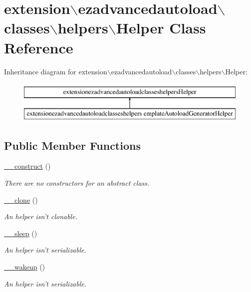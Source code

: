 \hypertarget{classextension_1_1ezadvancedautoload_1_1classes_1_1helpers_1_1_helper}{\section{extension$\backslash$ezadvancedautoload$\backslash$classes$\backslash$helpers$\backslash$\-Helper \-Class \-Reference}
\label{classextension_1_1ezadvancedautoload_1_1classes_1_1helpers_1_1_helper}
}
\-Inheritance diagram for extension$\backslash$ezadvancedautoload$\backslash$classes$\backslash$helpers$\backslash$\-Helper\-:\begin{figure}[H]
\begin{center}
\leavevmode
\includegraphics[height=2.000000cm]{classextension_1_1ezadvancedautoload_1_1classes_1_1helpers_1_1_helper}
\end{center}
\end{figure}
\subsection*{\-Public \-Member \-Functions}
\begin{DoxyCompactItemize}
\item 
\hyperlink{classextension_1_1ezadvancedautoload_1_1classes_1_1helpers_1_1_helper_add85e885141598709a72bfb9597faca7}{\-\_\-\-\_\-construct} ()
\begin{DoxyCompactList}\small\item\em \-There are no constructors for an abstract class. \end{DoxyCompactList}\item 
\hyperlink{classextension_1_1ezadvancedautoload_1_1classes_1_1helpers_1_1_helper_a1ba4093b3f040170370e36baaf970e60}{\-\_\-\-\_\-clone} ()
\begin{DoxyCompactList}\small\item\em \-An helper isn't clonable. \end{DoxyCompactList}\item 
\hyperlink{classextension_1_1ezadvancedautoload_1_1classes_1_1helpers_1_1_helper_a1bbf1edc42c8d0115a6164245faabf79}{\-\_\-\-\_\-sleep} ()
\begin{DoxyCompactList}\small\item\em \-An helper isn't serializable. \end{DoxyCompactList}\item 
\hyperlink{classextension_1_1ezadvancedautoload_1_1classes_1_1helpers_1_1_helper_a08df62000e6e73520c197c1f712e4ca8}{\-\_\-\-\_\-wakeup} ()
\begin{DoxyCompactList}\small\item\em \-An helper isn't serializable. \end{DoxyCompactList}\end{DoxyCompactItemize}



